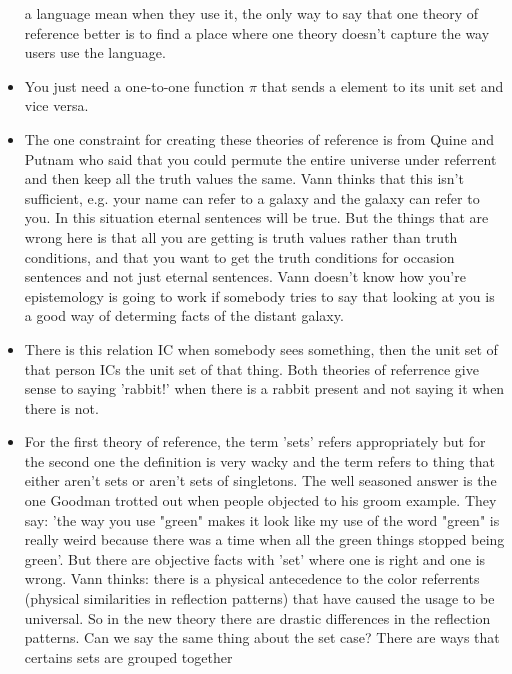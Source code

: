 \documentclass[12pt]{article}
\theoremstyle{definition}
\begin{document}
\begin{itemize}
        a language mean when they use it, the only way to say that one theory
        of reference better is to find a place where one theory doesn't capture
        the way users use the language.
    \item
        You just need a one-to-one function $\pi$ that sends a element to its
        unit set and vice versa. 
    \item
        The one constraint for creating these theories of reference is from
        Quine and Putnam who said that you could permute the entire universe
        under referrent and then keep all the truth values the same. Vann
        thinks that this isn't sufficient, e.g. your name can refer to a galaxy
        and the galaxy can refer to you. In this situation eternal sentences
        will be true. But the things that are wrong here is that all you are
        getting is truth values rather than truth conditions, and that you want
        to get the truth conditions for occasion sentences and not just eternal
        sentences. Vann doesn't know how you're epistemology is going to work
        if somebody tries to say that looking at you is a good way of determing
        facts of the distant galaxy. 
    \item
        There is this relation IC when somebody sees something, then the unit
        set of that person ICs the unit set of that thing. Both theories of
        referrence give sense to saying 'rabbit!' when there is a rabbit
        present and not saying it when there is not.
    \item
        For the first theory of reference, the term 'sets' refers appropriately
        but for the second one the definition is very wacky and the term refers
        to thing that either aren't sets or aren't sets of singletons. The well
        seasoned answer is the one Goodman trotted out when people objected to
        his groom example. They say: 'the way you use "green" makes it look
        like my use of the word "green" is really weird because there was a
        time when all the green things stopped being green'. But there are
        objective facts with 'set' where one is right and one is wrong. Vann
        thinks: there is a physical antecedence to the color referrents
        (physical similarities in reflection patterns) that have caused the
        usage to be universal. So in the new theory there are drastic
        differences in the reflection patterns. Can we say the same thing about
        the set case? There are ways that certains sets are grouped together

\end{itemize}
\end{document}
